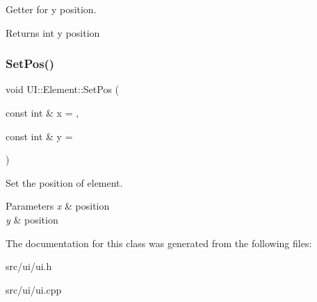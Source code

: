 Getter for y position. 

\begin{DoxyReturn}{Returns}
int y position 
\end{DoxyReturn}
\mbox{\label{classUI_1_1Element_ad2c9488af2a35976f55216ac2baa5c48}} 
\subsubsection{\texorpdfstring{Set\+Pos()}{SetPos()}}
{\footnotesize\ttfamily void U\+I\+::\+Element\+::\+Set\+Pos (\begin{DoxyParamCaption}\item[{const int \&}]{x = {},  }\item[{const int \&}]{y = {} }\end{DoxyParamCaption})\hspace{0.3cm}{\ttfamily [virtual]}}



Set the position of element. 


\begin{DoxyParams}{Parameters}
{\em x} & position \\
\hline
{\em y} & position \\
\hline
\end{DoxyParams}


The documentation for this class was generated from the following files\+:\begin{DoxyCompactItemize}
\item 
src/ui/ui.\+h\item 
src/ui/ui.\+cpp\end{DoxyCompactItemize}
